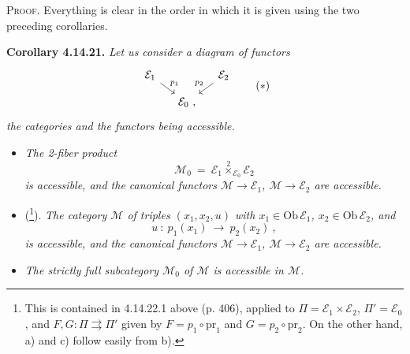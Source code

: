 \documentclass[11pt]{article}
\newcommand{\msp}[1]{\marginpar{\footnotesize [#1]}}
\newcommand{\Ob}{\mathrm{Ob}\,}
\newcommand{\pr}{\mathrm{pr}}
\begin{document}
\textsc{Proof}. Everything is clear in the order in which it is given using the two preceding corollaries.

\textbf{Corollary 4.14.21.} \textit{Let us consider a diagram of functors}
\[
\begin{tikzcd}[column sep=small, row sep=small]
\mathcal{E}_1 \arrow[dr, "p_1"] & & \mathcal{E}_2 \arrow[dl, "p_2"'] \\
& \mathcal{E}_0 \ , &
\end{tikzcd}
\tag*{$(*)$}
\]
\textit{the categories and the functors being accessible.}

\msp{page 397}
\begin{itemize}[leftmargin=2.5em]
\item[\textit{a)}] \textit{The 2-fiber product}
\[
\mathcal{M}_0 \ = \ \mathcal{E}_1 \overset{2}{\times}_{\mathcal{E}_0} \mathcal{E}_2
\]
\textit{is accessible, and the canonical functors $\mathcal{M} \longrightarrow \mathcal{E}_1$, $\mathcal{M} \longrightarrow \mathcal{E}_2$ are accessible.} %
\item[\textit{b)}] (\footnote[169]{This is contained in 4.14.22.1 above (p. 406), applied to $\Pi = \mathcal{E}_1{\times}\mathcal{E}_2$, $\Pi' = \mathcal{E}_0$, and $F, G : \Pi \rightrightarrows \Pi'$ given by $F = p_1\circ\pr_1$ and $G = p_2\circ\pr_2$. On the other hand, a) and c) follow easily from b).}). \textit{The category $\mathcal{M}$ of triples $(x_1,x_2,u)$ with $x_1 \in \Ob\mathcal{E}_1$, $x_2 \in \Ob\mathcal{E}_2$, and}
\[
u \ : \ p_1(x_1) \ \longrightarrow \ p_2(x_2) \ ,
\]
\textit{is accessible, and the canonical functors $\mathcal{M} \longrightarrow \mathcal{E}_1$, $\mathcal{M} \longrightarrow \mathcal{E}_2$ are accessible.}
\item[\textit{c)}] \textit{The strictly full subcategory $\mathcal{M}_0$ of $\mathcal{M}$ is accessible in $\mathcal{M}$.}
\end{itemize}
\end{document}
